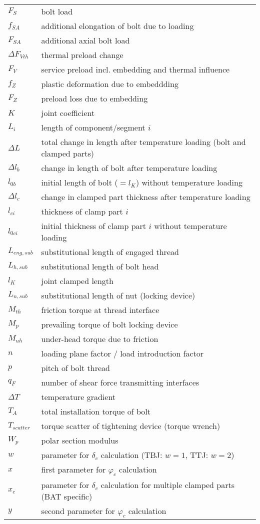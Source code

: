 \begin{longtable}{p{2cm} l}
  $F_S$ & bolt load \\
  $f_{SA}$ & additional elongation of bolt due to loading \\
  $F_{SA}$ & additional axial bolt load \\
  $\Delta F_{Vth}$ & thermal preload change \\
  $F_V$ & service preload incl. embedding and thermal influence \\
  $f_Z$ & plastic deformation due to embeddding \\
  $F_Z$ & preload loss due to embedding \\
  $K$ & joint coefficient \\
  $L_i$ & length of component/segment $i$ \\
  $\Delta L$ & total change in length after temperature loading (bolt and clamped parts) \\
  $\Delta l_b$ & change in length of bolt after temperature loading \\
  $l_{0b}$ & initial length of bolt ($=l_K$) without temperature loading \\
  $\Delta l_c$ & change in clamped part thickness after temperature loading \\
  $l_{ci}$ & thickness of clamp part $i$ \\
  $l_{0ci}$ & initial thickness of clamp part $i$ without temperature loading \\
  $L_{eng,sub}$ & substitutional length of engaged thread \\
  $L_{h,sub}$ & substitutional length of bolt head \\
  $l_K$ & joint clamped length \\
  $L_{n,sub}$ & substitutional length of nut (locking device) \\
  $M_{th}$ & friction torque at thread interface \\
  $M_p$ & prevailing torque of bolt locking device \\
  $M_{uh}$ & under-head torque due to friction \\
  $n$ & loading plane factor / load introduction factor \\
  $p$ & pitch of bolt thread \\
  $q_F$ & number of shear force transmitting interfaces \\
  $\Delta T$ & temperature gradient \\
  $T_A$ & total installation torque of bolt \\
  $T_{scatter}$ & torque scatter of tightening device (torque wrench) \\
  $W_p$ & polar section modulus \\
  $w$ & parameter for $\delta_c$ calculation (TBJ: $w=1$, TTJ: $w=2$) \\
  $x$ & first parameter for $\varphi_c$ calculation \\
  $x_c$ & parameter for $\delta_c$ calculation for multiple clamped parts (BAT specific) \\
  $y$ & second parameter for $\varphi_c$ calculation \\
\end{longtable}

